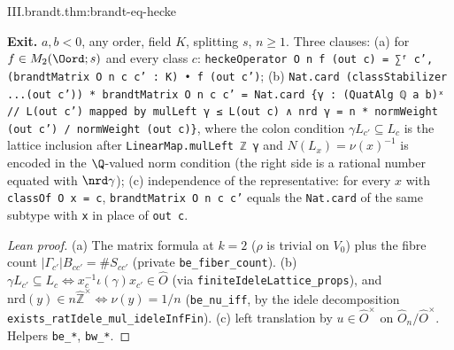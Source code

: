 \begin{tfformal}{III.brandt.thm:brandt-eq-hecke}
\begin{tffidelity}
\textbf{Exit.} $a,b<0$, any order, field $K$, splitting $s$, $n\ge1$. Three clauses: (a) for $f\in M_2(\Oord;s)$ and every class $c$: \texttt{heckeOperator O n f (out c) = ∑ᶠ c', (brandtMatrix O n c c' : K) • f (out c')}; (b) \texttt{Nat.card (classStabilizer ...(out c')) * brandtMatrix O n c c' = Nat.card \{γ : (QuatAlg ℚ a b)ˣ // L(out c') mapped by mulLeft γ ≤ L(out c) ∧ nrd γ = n * normWeight (out c') / normWeight (out c)\}}, where the colon condition $\gamma L_{c'}\subseteq L_c$ is the lattice inclusion after \texttt{LinearMap.mulLeft ℤ γ} and $N(L_x)=\nu(x)^{-1}$ is encoded in the $\Q$-valued norm condition (the right side is a rational number equated with $\nrd\gamma$); (c) independence of the representative: for every $x$ with \texttt{classOf O x = c}, \texttt{brandtMatrix O n c c'} equals the \texttt{Nat.card} of the same subtype with \texttt{x} in place of \texttt{out c}.
\end{tffidelity}
\end{tfformal}
\begin{proof}[Lean proof]
(a) The matrix formula at $k=2$ ($\rho$ is trivial on $V_0$) plus the fibre count $|\Gamma_{c'}|B_{cc'}=\#S_{cc'}$ (private \texttt{be\_fiber\_count}). (b) $\gamma L_{c'}\subseteq L_c\iff x_c^{-1}\iota(\gamma)x_{c'}\in\hat O$ (via \texttt{finiteIdeleLattice\_props}), and $\mathrm{nrd}(y)\in n\widehat{\mathbb Z}^\times\iff\nu(y)=1/n$ (\texttt{be\_nu\_iff}, by the idele decomposition \texttt{exists\_ratIdele\_mul\_ideleInfFin}). (c) left translation by $u\in\hat O^\times$ on $\hat O_n/\hat O^\times$. Helpers \texttt{be\_*}, \texttt{bw\_*}.
\end{proof}

